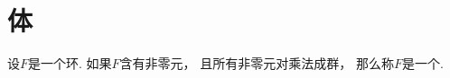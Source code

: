 \section{体}
\begin{definition}
设\(F\)是一个环.
如果\(F\)含有非零元，
且所有非零元对乘法成群，
那么称\(F\)是一个.
\end{definition}
